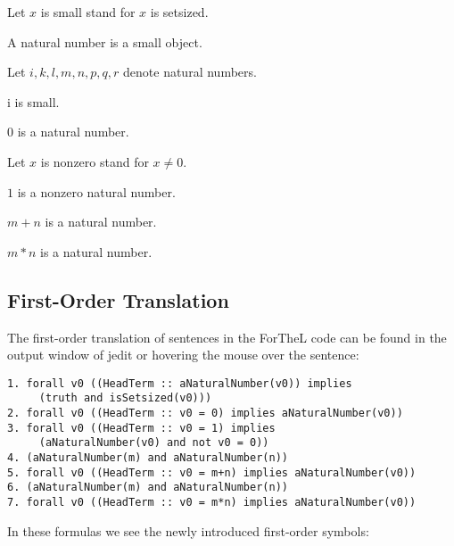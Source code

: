 \documentclass[11pt]{article}
\begin{document}
\begin{forthel}

Let $x$ is small stand for $x$ is setsized.

\begin{signature}  A natural number is a small object.
\end{signature}

Let $i,k,l,m,n,p,q,r$ denote natural numbers.

\begin{lemma} i is small. \end{lemma}

\begin{signature} $0$ is a natural number.
\end{signature}

Let $x$ is nonzero stand for $x \neq 0$.

\begin{signature} $1$ is a nonzero natural number.
\end{signature}

\begin{signature} $m + n$ is a natural number.
\end{signature}

\begin{signature} $m * n$ is a natural number.
\end{signature}
\end{forthel}

\subsection{First-Order Translation}
The first-order translation
of sentences in the ForTheL code can be found in the output
window of jedit or hovering the mouse
over the sentence:
\begin{small}
\begin{verbatim}
1. forall v0 ((HeadTerm :: aNaturalNumber(v0)) implies 
     (truth and isSetsized(v0)))
2. forall v0 ((HeadTerm :: v0 = 0) implies aNaturalNumber(v0)) 
3. forall v0 ((HeadTerm :: v0 = 1) implies 
     (aNaturalNumber(v0) and not v0 = 0)) 
4. (aNaturalNumber(m) and aNaturalNumber(n)) 
5. forall v0 ((HeadTerm :: v0 = m+n) implies aNaturalNumber(v0)) 
6. (aNaturalNumber(m) and aNaturalNumber(n)) 
7. forall v0 ((HeadTerm :: v0 = m*n) implies aNaturalNumber(v0)) 
\end{verbatim}
\end{small}
In these formulas we see the newly introduced first-order symbols:
\end{document}
